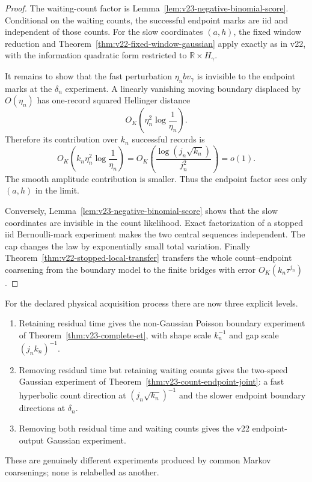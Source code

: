 \begin{proof}
The waiting-count factor is Lemma~\ref{lem:v23-negative-binomial-score}.
Conditional on the waiting counts, the successful endpoint marks are iid and
independent of those counts.  For the slow coordinates \((a,h)\), the fixed
window reduction and Theorem~\ref{thm:v22-fixed-window-gaussian} apply exactly
as in v22, with the information quadratic form restricted to
\(\mathbb R\times H_\gamma\).

It remains to show that the fast perturbation
\(\eta_nb v_\gamma\) is invisible to the endpoint marks at the
\(\delta_n\) experiment.  A linearly vanishing moving boundary displaced by
\(O(\eta_n)\) has one-record squared Hellinger distance
\[
 O_K\!\left(\eta_n^2\log\frac1{\eta_n}\right).
\]
Therefore its contribution over \(k_n\) successful records is
\[
 O_K\!\left(
 k_n\eta_n^2\log\frac1{\eta_n}\right)
 =O_K\!\left(
 \frac{\log(j_n\sqrt{k_n})}{j_n^2}
 \right)=o(1).
\]
The smooth amplitude contribution is smaller.  Thus the endpoint factor sees
only \((a,h)\) in the limit.

Conversely, Lemma~\ref{lem:v23-negative-binomial-score} shows that the slow
coordinates are invisible in the count likelihood.  Exact factorization of a
stopped iid Bernoulli-mark experiment makes the two central sequences
independent.  The cap changes the law by exponentially small total variation.
Finally Theorem~\ref{thm:v22-stopped-local-transfer} transfers the whole
count--endpoint coarsening from the boundary model to the finite bridges with
error \(O_K(k_n\tau^{j_n})\).
\end{proof}

\begin{remark}
\label{rem:v23-three-level-information}
For the declared physical acquisition process there are now three explicit
levels.
\begin{enumerate}
\item Retaining residual time gives the non-Gaussian Poisson boundary
experiment of Theorem~\ref{thm:v23-complete-et}, with shape scale
\(k_n^{-1}\) and gap scale \((j_nk_n)^{-1}\).
\item Removing residual time but retaining waiting counts gives the two-speed
Gaussian experiment of Theorem~\ref{thm:v23-count-endpoint-joint}: a fast
hyperbolic count direction at \((j_n\sqrt{k_n})^{-1}\) and the slower endpoint
boundary directions at \(\delta_n\).
\item Removing both residual time and waiting counts gives the v22
endpoint-output Gaussian experiment.
\end{enumerate}
These are genuinely different experiments produced by common Markov
coarsenings; none is relabelled as another.
\end{remark}
